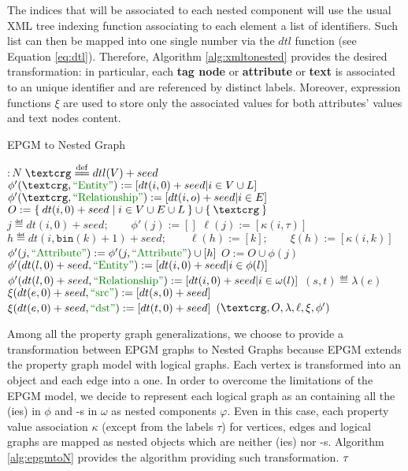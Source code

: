  The indices that will be associated to each nested component will use the usual XML tree indexing function \cite{Liu16} associating to each element a list of identifiers. Such list can then be mapped into one single number via the $dtl$ function (see Equation \vref{eq:dtl}). Therefore, Algorithm \vref{alg:xmltonested} provides the desired transformation: in particular, each \textbf{tag node} or \textbf{attribute} or \textbf{text} is associated to an unique identifier and are referenced by distinct labels. Moreover, expression functions $\xi$ are used to store only the associated values for both attributes' values and text nodes content.

\begin{algorithm}[!t]
	\caption{EPGM to Nested Graph}\label{alg:epgmtoN}
	{
		\begin{minipage}{\linewidth}
			\begin{algorithmic}[1]
				 $\colon N$ 
				\State $\ngraph \eqdef dtl(V)+seed$
				\State $\phi'(\ngraph,\ONTA):=[dt(i,0)+seed|i\in V\cup L]$
				\State $\phi'(\ngraph,\RELA):=[dt(i,o)+seed|i\in E]$
				\State $O:= \Set{dt(i, 0)+seed|i\in V\cup E\cup L}\cup\Set{\ngraph}$
				\State $j \eqdef dt(i,0)+seed;\qquad \phi'(j):=[]$
				\State $\ell(j):=[\kappa(i,\tau)]$
				\State $h \eqdef dt(i,\texttt{bin}(k)+1)+seed;\qquad \ell(h):=[k];\qquad \xi(h):=[\kappa(i,k)]$
				\State $\phi'(j,\ATTR):=\phi'(j,\ATTR)\cup[h]$
				\EndFor
				\State $O:=O\cup \phi(j)$
				\EndFor
				\State $\phi'(dt(l,0)+seed,\ONTA):=[dt(i,0)+seed|i\in\phi(l)]$
				\State $\phi'(dt(l,0)+seed,\RELA):=[dt(i,0)+seed|i\in\omega(l)]$
				\EndFor
				\State $(s,t)\eqdef \lambda(e)$
				\State $\xi(dt(e,0)+seed,\SRC):=[dt(s,0)+seed]$
				\State $\xi(dt(e,0)+seed,\DST):=[dt(t,0)+seed]$
				\EndFor
				\State \Return $(\ngraph,O,\lambda,\ell,\xi,\phi')$
				\EndFunction
			\end{algorithmic}
	\end{minipage}}
\end{algorithm}
Among all the property graph generalizations, we choose to provide a transformation between EPGM graphs to Nested Graphs because EPGM extends the property graph model with logical graphs. Each vertex is transformed into an \ONTA object and each edge into a \RELA one. In order to overcome the limitations of the EPGM model, we decide to represent each logical graph as an \ONTA containing all the \ONTA(ies) in $\phi$ and \RELA-s in $\omega$ as nested components $\varphi$. Even in this case, each property value association $\kappa$ (except from the labels $\tau$) for vertices, edges and logical graphs are mapped as nested objects which are neither \ONTA(ies) nor \RELA-s. Algorithm \vref{alg:epgmtoN} provides the algorithm providing such transformation. $\ttranslIndex{EPGM to Nested Graph}$


